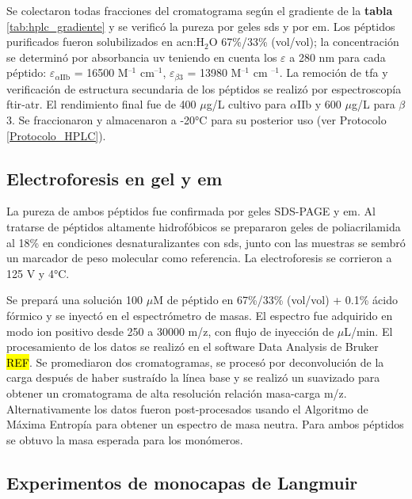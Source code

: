 Se colectaron todas fracciones del cromatograma según el gradiente de la \textbf{tabla} \ref{tab:hplc_gradiente} y se verificó la pureza por geles \ac{sds} y por \ac{em}.  Los péptidos purificados fueron solubilizados en \ac{acn}:H$_2$O 67\%/33\% (vol/vol); la concentración se determinó por absorbancia \ac{uv} teniendo en cuenta los {\Large{$\varepsilon$}} a 280 nm para cada péptido: {\Large{$\varepsilon$}}$_{\alpha \text{IIb}}$ = 16500 M$^{\text{--1}}$ cm$^{\text{--1}}$, {\Large{$\varepsilon$}}$_{\beta \text{3}}$ = 13980 M$^{\text{--1}}$ cm $^{\text{--1}}$. La remoción de \ac{tfa} y verificación de estructura secundaria de los péptidos se realizó por espectroscopía \ac{ftir}-\ac{atr}. El rendimiento final fue de 400 $\mu$g/L cultivo para $\alpha$IIb y 600 $\mu$g/L para $\beta$3. Se fraccionaron y almacenaron a -20°C para su posterior uso (ver Protocolo \ref{Protocolo_HPLC}).

\subsection{Electroforesis en gel y \ac{em}}

La pureza de ambos péptidos fue confirmada por geles SDS-PAGE y \ac{em}. Al tratarse de péptidos altamente hidrofóbicos se prepararon geles de poliacrilamida al 18\% en condiciones desnaturalizantes con \ac{sds}, junto con las muestras se sembró un marcador de peso molecular como referencia. La electroforesis se corrieron a 125 V y 4°C.

Se prepará una solución 100 $\mu$M de péptido en 67\%/33\% (vol/vol) + 0.1\% ácido fórmico y se inyectó en el espectrómetro de masas. El espectro fue adquirido en modo ion positivo desde 250 a 30000 m/z, con flujo de inyección de $\mu$L/min. El procesamiento de los datos se realizó en el software Data Analysis de Bruker \hl{REF}. Se promediaron dos cromatogramas, se procesó por deconvolución de la carga después de haber sustraído la línea base y se realizó un suavizado para obtener un cromatograma de alta resolución relación masa-carga m/z. Alternativamente los datos fueron post-procesados usando el Algoritmo de Máxima Entropía para obtener un espectro de masa neutra. Para ambos péptidos se obtuvo la masa esperada para los monómeros.

\subsection{Experimentos de monocapas de Langmuir}

